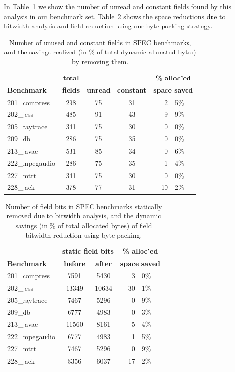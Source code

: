 \documentclass{sig-alt-full}
\begin{document}
In Table~\ref{tab:const-unused} we show the number of unread and
constant fields found by this analysis in our benchmark set.
Table~\ref{tab:bitwidth-results} shows the space reductions due to
bitwidth analysis and field reduction using our byte packing strategy.
\begin{table}[t]
\begin{tabular}{lcccr@{.}l}
&\bf total&&&\multicolumn{2}{c}{\bf\% alloc'ed}\\
\bf Benchmark&\bf fields &\bf unread &\bf constant &
\multicolumn{2}{c}{\bf space saved} \\\hline
201\_compress   & 298 &   75   &   31   &  2&5\% \\
202\_jess       & 485 &   91   &   43   &  9&9\% \\
205\_raytrace   & 341 &   75   &   30   &  0&0\% \\
209\_db         & 286 &   75   &   35   &  0&0\% \\
213\_javac      & 531 &   85   &   34   &  0&6\% \\
222\_mpegaudio  & 286 &   75   &   35   &  1&4\% \\
227\_mtrt       & 341 &   75   &   30   &  0&0\% \\
228\_jack       & 378 &   77   &   31   & 10&2\% \\
\end{tabular}
\caption{Number of unused and constant fields in SPEC benchmarks,
  and the savings realized (in \% of total dynamic allocated bytes) by
  removing them.}
\label{tab:const-unused}
\end{table}
\begin{table}[t]
\centering\begin{tabular}{lccr@{.}l}
&\multicolumn{2}{c}{\bf static field bits}&\multicolumn{2}{c}{\bf\% alloc'ed}\\
\bf Benchmark &
\bf before & \bf after &
\multicolumn{2}{c}{\bf space saved} \\ \hline
201\_compress   & 7591& 5430&  3&0\% \\
202\_jess       &13349&10634& 30&1\% \\
205\_raytrace   & 7467& 5296&  0&9\% \\
209\_db         & 6777& 4983&  0&3\% \\
213\_javac      &11560& 8161&  5&4\% \\
222\_mpegaudio  & 6777& 4983&  1&5\% \\
227\_mtrt       & 7467& 5296&  0&9\% \\
228\_jack       & 8356& 6037& 17&2\% \\
\end{tabular}
\caption{Number of field bits in SPEC benchmarks statically removed
  due to bitwidth analysis,
  and the dynamic savings (in \% of total allocated bytes) of
  field bitwidth reduction using byte packing.}
\label{tab:bitwidth-results}
\end{table}
\end{document}

